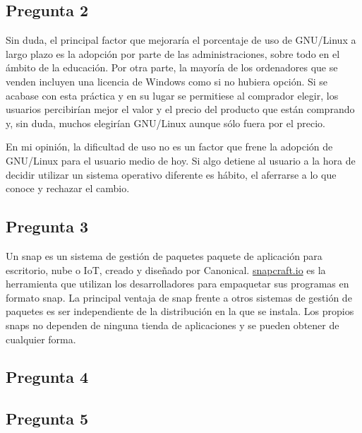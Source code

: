 \subsection{Pregunta 2}
Sin duda, el principal factor que mejoraría el porcentaje de uso de GNU/Linux a largo plazo es la adopción por parte de las administraciones, sobre todo en el ámbito de la educación. Por otra parte, la mayoría de los ordenadores que se venden incluyen una licencia de Windows como si no hubiera opción. Si se acabase con esta práctica y en su lugar se permitiese al comprador elegir, los usuarios percibirían mejor el valor y el precio del producto que están comprando y, sin duda, muchos elegirían GNU/Linux aunque sólo fuera por el precio.

En mi opinión, la dificultad de uso no es un factor que frene la adopción de GNU/Linux para el usuario medio de hoy. Si algo detiene al usuario a la hora de decidir utilizar un sistema operativo diferente es hábito, el aferrarse a lo que conoce y rechazar el cambio.

\subsection{Pregunta 3}
Un snap es un sistema de gestión de paquetes paquete de aplicación para escritorio, nube o IoT, creado y diseñado por Canonical. \href{http://snapcraft.io}{snapcraft.io} es la herramienta que utilizan los desarrolladores para empaquetar sus programas en formato snap.
La principal ventaja de snap frente a otros sistemas de gestión de paquetes es ser independiente de la distribución en la que se instala. Los propios snaps no dependen de ninguna tienda de aplicaciones y se pueden obtener de cualquier forma.

\subsection{Pregunta 4}


\subsection{Pregunta 5}


